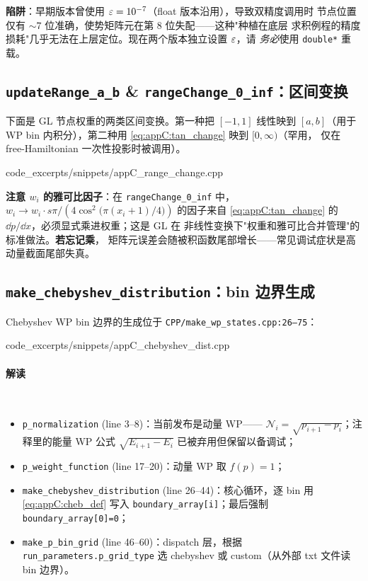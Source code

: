 \textbf{陷阱}：早期版本曾使用 $\varepsilon=10^{-7}$（float 版本沿用），导致双精度调用时
节点位置仅有 $\sim 7$ 位准确，使势矩阵元在第 8 位失配——这种"种植在底层
求积例程的精度损耗"几乎无法在上层定位。现在两个版本独立设置 $\varepsilon$，请
\emph{务必}使用 \texttt{double*} 重载。

\subsection{\texttt{updateRange\_a\_b} \& \texttt{rangeChange\_0\_inf}：区间变换}

下面是 GL 节点权重的两类区间变换。第一种把 $[-1,1]$ 线性映到 $[a,b]$（用于
WP bin 内积分），第二种用 \eqref{eq:appC:tan_change} 映到 $[0,\infty)$（罕用，
仅在 free-Hamiltonian 一次性投影时被调用）。


{code_excerpts/snippets/appC_range_change.cpp}

\textbf{注意 $w_i$ 的雅可比因子}：在 \texttt{rangeChange\_0\_inf} 中，
$w_i\to w_i\cdot s\pi/(4\cos^{2}\bigl(\pi(x_i+1)/4\bigr))$ 的因子来自
\eqref{eq:appC:tan_change} 的 $\dd p/\dd x$，必须显式乘进权重；这是 GL 在
非线性变换下"权重和雅可比合并管理"的标准做法。\textbf{若忘记乘}，
矩阵元误差会随被积函数尾部增长——常见调试症状是高动量截面尾部失真。

\subsection{\texttt{make\_chebyshev\_distribution}：bin 边界生成}

Chebyshev WP bin 边界的生成位于 \texttt{CPP/make\_wp\_states.cpp:26--75}：


{code_excerpts/snippets/appC_chebyshev_dist.cpp}

\paragraph{解读}\

\begin{itemize}
\item \texttt{p\_normalization} (line 3--8)：当前发布是动量 WP——
      $\mathcal{N}_i=\sqrt{p_{i+1}-p_i}$；注释里的能量 WP 公式
      $\sqrt{E_{i+1}-E_i}$ 已被弃用但保留以备调试；
\item \texttt{p\_weight\_function} (line 17--20)：动量 WP 取 $f(p)=1$；
\item \texttt{make\_chebyshev\_distribution} (line 26--44)：核心循环，逐 bin
      用 \eqref{eq:appC:cheb_def} 写入 \texttt{boundary\_array[i]}；最后强制
      \texttt{boundary\_array[0]=0}；
\item \texttt{make\_p\_bin\_grid} (line 46--60)：dispatch 层，根据
      \texttt{run\_parameters.p\_grid\_type} 选 chebyshev 或 custom（从外部
      txt 文件读 bin 边界）。
\end{itemize}

